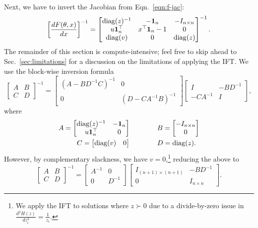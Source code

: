 \documentclass[11pt]{article}
\begin{document}
Next, we have to invert the Jacobian from Eqn.~\ref{eqn:f-jac}:
\begin{equation}
\label{eqn:dsystem-matrix}
\left[\frac{dF(\theta,x)}{dx}\right]^{-1} = \begin{bmatrix}
\mathrm{diag}(z)^{-1} & -\mathbf{1}_n & -I_{n\times n} \\
u\mathbf{1}_n^\top & x^\top\mathbf{1}_n - 1 & 0\\
\mathrm{diag}(v) & 0 & \mathrm{diag}(z)
\end{bmatrix}^{-1}.
\end{equation}
The remainder of this section is compute-intensive;
feel free to skip ahead to Sec.~\ref{sec:limitations} for a discussion
on the limitations of applying the IFT.
We use the block-wise inversion formula
\begin{equation*}
\begin{bmatrix}
A & B\\
C & D
\end{bmatrix}^{-1} = \begin{bmatrix}
    (A - BD^{-1}C)^{-1} & 0\\
    0 & (D - CA^{-1}B)^{-1}
\end{bmatrix}
\begin{bmatrix}
    I & -BD^{-1}\\
    -CA^{-1} & I
\end{bmatrix},
\end{equation*}
where
\begin{align*}
A = \begin{bmatrix} \mathrm{diag}(z)^{-1} & -\mathbf{1}_n \\ u\mathbf{1}_n^\top & 0 \end{bmatrix}&\qquad\qquad
B = \begin{bmatrix}-I_{n\times n} \\ 0\end{bmatrix}\\
C = \begin{bmatrix}\mathrm{diag}(v) & 0\end{bmatrix} &\qquad\qquad
D = \mathrm{diag}(z).
\end{align*}
However, by complementary slackness, we have $v = 0$,\footnote{
We apply the IFT to solutions where $z\succ 0$ due to a divide-by-zero issue
in $\frac{d^2H(z)}{dz_i^2} = \frac{1}{z_i}$.
}
reducing the above to
\begin{equation*}
\begin{bmatrix}
A & B\\
C & D
\end{bmatrix}^{-1} = \begin{bmatrix}
    A^{-1} & 0\\
    0 & D^{-1}
\end{bmatrix}
\begin{bmatrix}
    I_{(n+1)\times (n+1)} & -BD^{-1}\\
    0 & I_{n \times n}
\end{bmatrix}.
\end{equation*}
\end{document}
